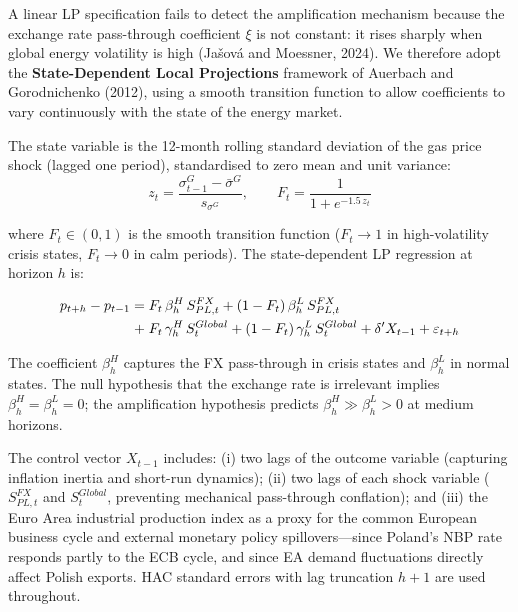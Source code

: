 \documentclass[12pt, a4paper]{article}
\begin{document}
A linear LP specification fails to detect the amplification mechanism because the exchange rate pass-through coefficient $\xi$ is not constant: it rises sharply when global energy volatility is high (Ja\v{s}ov\'{a} and Moessner, 2024). We therefore adopt the \textbf{State-Dependent Local Projections} framework of Auerbach and Gorodnichenko (2012), using a smooth transition function to allow coefficients to vary continuously with the state of the energy market.

The state variable is the 12-month rolling standard deviation of the gas price shock (lagged one period), standardised to zero mean and unit variance:
\[
z_t = \frac{\sigma_{t-1}^G - \bar{\sigma}^G}{s_{\sigma^G}}, \qquad
F_t = \frac{1}{1 + e^{-1.5\, z_t}}
\]

where $F_t \in (0,1)$ is the smooth transition function ($F_t \to 1$ in high-volatility crisis states, $F_t \to 0$ in calm periods). The state-dependent LP regression at horizon $h$ is:

\begin{align}
p_{t+h} - p_{t-1} =\;
  &F_t\,\beta^{H}_h\, S^{FX}_{PL,t}
  + (1-F_t)\,\beta^{L}_h\, S^{FX}_{PL,t} \notag \\
  +\;&F_t\,\gamma^{H}_h\, S^{Global}_t
  + (1-F_t)\,\gamma^{L}_h\, S^{Global}_t
  + \delta' X_{t-1} + \varepsilon_{t+h}
\end{align}

The coefficient $\beta^{H}_h$ captures the FX pass-through in crisis states and $\beta^{L}_h$ in normal states. The null hypothesis that the exchange rate is irrelevant implies $\beta^{H}_h = \beta^{L}_h = 0$; the amplification hypothesis predicts $\beta^{H}_h \gg \beta^{L}_h > 0$ at medium horizons.

The control vector $X_{t-1}$ includes: (i) two lags of the outcome variable (capturing inflation inertia and short-run dynamics); (ii) two lags of each shock variable ($S^{FX}_{PL,t}$ and $S^{Global}_t$, preventing mechanical pass-through conflation); and (iii) the Euro Area industrial production index as a proxy for the common European business cycle and external monetary policy spillovers---since Poland's NBP rate responds partly to the ECB cycle, and since EA demand fluctuations directly affect Polish exports. HAC standard errors with lag truncation $h+1$ are used throughout.


\end{document}

